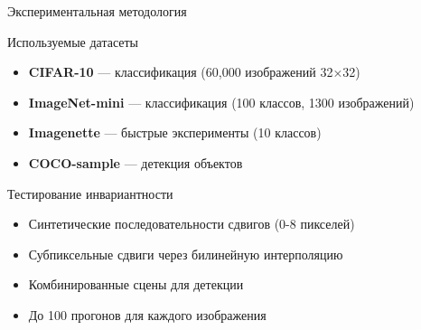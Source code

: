 \documentclass[aspectratio=169]{beamer}
\begin{document}
\begin{frame}{Экспериментальная методология}
    \begin{block}{Используемые датасеты}
        \begin{itemize}
            \item \textbf{CIFAR-10} — классификация (60,000 изображений 32×32)
            \item \textbf{ImageNet-mini} — классификация (100 классов, 1300 изображений)
            \item \textbf{Imagenette} — быстрые эксперименты (10 классов)
            \item \textbf{COCO-sample} — детекция объектов
        \end{itemize}
    \end{block}
    
    \begin{block}{Тестирование инвариантности}
        \begin{itemize}
            \item Синтетические последовательности сдвигов (0-8 пикселей)
            \item Субпиксельные сдвиги через билинейную интерполяцию
            \item Комбинированные сцены для детекции
            \item До 100 прогонов для каждого изображения
        \end{itemize}
    \end{block}
\end{frame}
\end{document}
